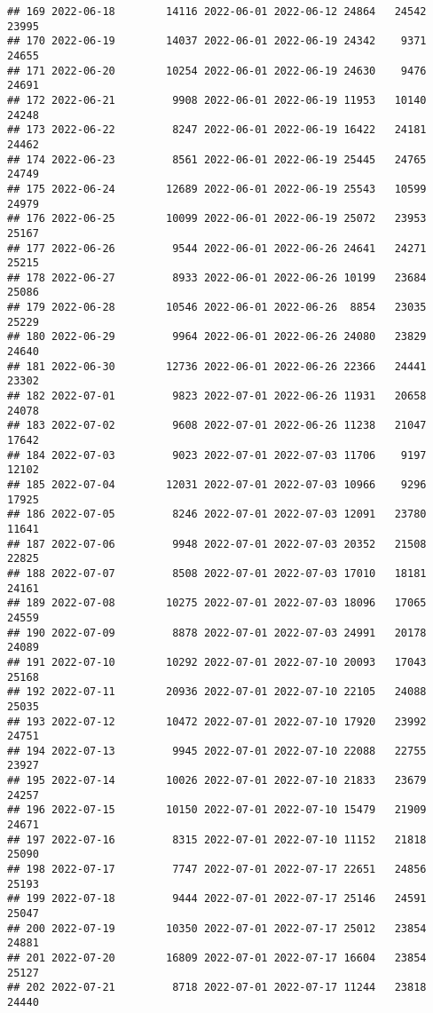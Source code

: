 \documentclass[
]{article}
\begin{document}
\begin{verbatim}
## 169 2022-06-18        14116 2022-06-01 2022-06-12 24864   24542      23995
## 170 2022-06-19        14037 2022-06-01 2022-06-19 24342    9371      24655
## 171 2022-06-20        10254 2022-06-01 2022-06-19 24630    9476      24691
## 172 2022-06-21         9908 2022-06-01 2022-06-19 11953   10140      24248
## 173 2022-06-22         8247 2022-06-01 2022-06-19 16422   24181      24462
## 174 2022-06-23         8561 2022-06-01 2022-06-19 25445   24765      24749
## 175 2022-06-24        12689 2022-06-01 2022-06-19 25543   10599      24979
## 176 2022-06-25        10099 2022-06-01 2022-06-19 25072   23953      25167
## 177 2022-06-26         9544 2022-06-01 2022-06-26 24641   24271      25215
## 178 2022-06-27         8933 2022-06-01 2022-06-26 10199   23684      25086
## 179 2022-06-28        10546 2022-06-01 2022-06-26  8854   23035      25229
## 180 2022-06-29         9964 2022-06-01 2022-06-26 24080   23829      24640
## 181 2022-06-30        12736 2022-06-01 2022-06-26 22366   24441      23302
## 182 2022-07-01         9823 2022-07-01 2022-06-26 11931   20658      24078
## 183 2022-07-02         9608 2022-07-01 2022-06-26 11238   21047      17642
## 184 2022-07-03         9023 2022-07-01 2022-07-03 11706    9197      12102
## 185 2022-07-04        12031 2022-07-01 2022-07-03 10966    9296      17925
## 186 2022-07-05         8246 2022-07-01 2022-07-03 12091   23780      11641
## 187 2022-07-06         9948 2022-07-01 2022-07-03 20352   21508      22825
## 188 2022-07-07         8508 2022-07-01 2022-07-03 17010   18181      24161
## 189 2022-07-08        10275 2022-07-01 2022-07-03 18096   17065      24559
## 190 2022-07-09         8878 2022-07-01 2022-07-03 24991   20178      24089
## 191 2022-07-10        10292 2022-07-01 2022-07-10 20093   17043      25168
## 192 2022-07-11        20936 2022-07-01 2022-07-10 22105   24088      25035
## 193 2022-07-12        10472 2022-07-01 2022-07-10 17920   23992      24751
## 194 2022-07-13         9945 2022-07-01 2022-07-10 22088   22755      23927
## 195 2022-07-14        10026 2022-07-01 2022-07-10 21833   23679      24257
## 196 2022-07-15        10150 2022-07-01 2022-07-10 15479   21909      24671
## 197 2022-07-16         8315 2022-07-01 2022-07-10 11152   21818      25090
## 198 2022-07-17         7747 2022-07-01 2022-07-17 22651   24856      25193
## 199 2022-07-18         9444 2022-07-01 2022-07-17 25146   24591      25047
## 200 2022-07-19        10350 2022-07-01 2022-07-17 25012   23854      24881
## 201 2022-07-20        16809 2022-07-01 2022-07-17 16604   23854      25127
## 202 2022-07-21         8718 2022-07-01 2022-07-17 11244   23818      24440

\end{verbatim}
\end{document}

